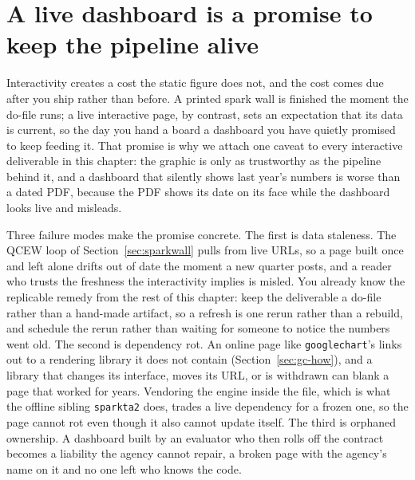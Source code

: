 \section{A live dashboard is a promise to keep the pipeline alive}\label{ch10-sec:maintenance}
Interactivity creates a cost the static figure does not, and the cost comes due after you ship rather than before. A printed spark wall is finished the moment the do-file runs; a live interactive page, by contrast, sets an expectation that its data is current, so the day you hand a board a dashboard you have quietly promised to keep feeding it. That promise is why we attach one caveat to every interactive deliverable in this chapter: the graphic is only as trustworthy as the pipeline behind it, and a dashboard that silently shows last year's numbers is worse than a dated PDF, because the PDF shows its date on its face while the dashboard looks live and misleads.

Three failure modes make the promise concrete. The first is data staleness. The QCEW loop of Section~\ref{sec:sparkwall} pulls from live URLs, so a page built once and left alone drifts out of date the moment a new quarter posts, and a reader who trusts the freshness the interactivity implies is misled. You already know the replicable remedy from the rest of this chapter: keep the deliverable a do-file rather than a hand-made artifact, so a refresh is one rerun rather than a rebuild, and schedule the rerun rather than waiting for someone to notice the numbers went old. The second is dependency rot. An online page like \texttt{googlechart}'s links out to a rendering library it does not contain (Section~\ref{sec:gc-how}), and a library that changes its interface, moves its URL, or is withdrawn can blank a page that worked for years. Vendoring the engine inside the file, which is what the offline sibling \texttt{sparkta2} does, trades a live dependency for a frozen one, so the page cannot rot even though it also cannot update itself. The third is orphaned ownership. A dashboard built by an evaluator who then rolls off the contract becomes a liability the agency cannot repair, a broken page with the agency's name on it and no one left who knows the code.

